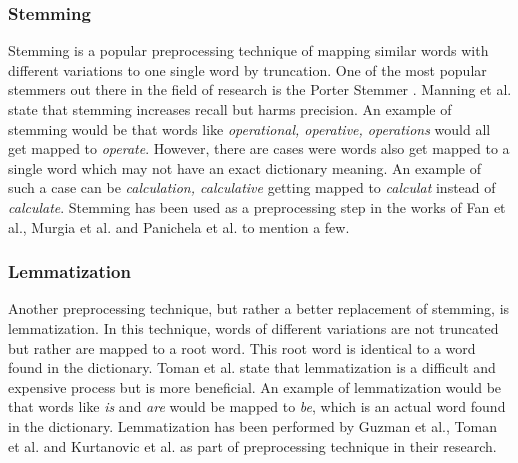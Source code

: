 \documentclass[a4paper,12pt,twoside]{report}
\begin{document}
\subsubsection{Stemming}
Stemming is a popular preprocessing technique of mapping similar words with different variations to one single word by truncation. One of the most popular stemmers out there in the field of research is the Porter Stemmer \cite{Porter}. Manning et al.\cite{Manning2009} state that stemming increases recall but harms precision. An example of stemming would be that words like \textit{operational, operative, operations} would all get mapped to \textit{operate}. However, there are cases were words also get mapped to a single word which may not have an exact dictionary meaning. An example of such a case can be \textit{calculation, calculative} getting mapped to \textit{calculat} instead of \textit{calculate}\cite{Toman2006}. Stemming has been used as a preprocessing step in the works of Fan et al.\cite{Fan2017}, Murgia et al.\cite{Murgia2016} and Panichela et al.\cite{Panichella2014a} to mention a few.

\subsubsection{Lemmatization}
Another preprocessing technique, but rather a better replacement of stemming, is lemmatization. In this technique, words of different variations are not truncated but rather are mapped to a root word. This root word is identical to a word found in the dictionary. Toman et al.\cite{Toman2006} state that lemmatization is a difficult and expensive process but is more beneficial. An example of lemmatization would be that words like \textit{is} and \textit{are} would be mapped to \textit{be}, which is an actual word found in the dictionary. Lemmatization has been performed by Guzman et al.\cite{Guzman2014}, Toman et al. \cite{Toman2006} and Kurtanovic et al.\cite{Kurtanovic2017} as part of preprocessing technique in their research. 
\end{document}

